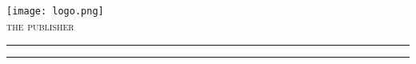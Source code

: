 \texttt{[image: logo.png]}\\[1cm] 

{\large\textsc{the publisher}} %

\vspace{0.1\textheight} %


\rule{\textwidth}{0.4pt} %

\vspace{2pt}\vspace{-\baselineskip} %

\rule{\textwidth}{1pt} %


